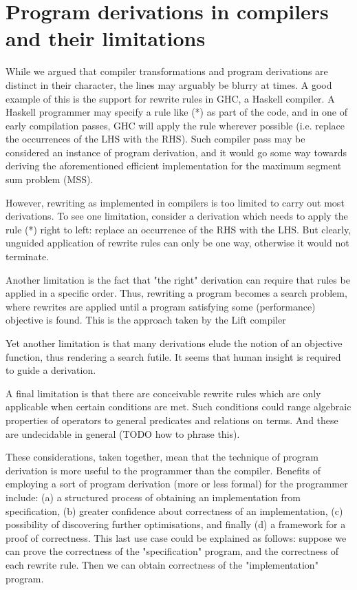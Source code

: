 \documentclass[bsc,frontabs,oneside,singlespacing,parskip,deptreport]{infthesis}
\theoremstyle{definition}
\theoremstyle{lemma}
\begin{document}
\section{Program derivations in compilers and their limitations}
\label{sec:progr-deriv-comp}

While we argued that compiler transformations and program derivations
are distinct in their character, the lines may arguably be blurry at
times. A good example of this is the support for rewrite rules in GHC,
a Haskell compiler. A Haskell programmer may specify a rule like (*)
as part of the code, and in one of early compilation passes, GHC will
apply the rule wherever possible (i.e. replace the occurrences of the
LHS with the RHS). Such compiler pass may be considered an instance of
program derivation, and it would go some way towards deriving the
aforementioned efficient implementation for the maximum segment sum
problem (MSS).

However, rewriting as implemented in compilers is too limited to carry
out most derivations. To see one limitation, consider a derivation
which needs to apply the rule (*) right to left: replace an occurrence
of the RHS with the LHS. But clearly, unguided application of rewrite
rules can only be one way, otherwise it would not terminate.

Another limitation is the fact that "the right" derivation can require
that rules be applied in a specific order. Thus, rewriting a program
becomes a search problem, where rewrites are applied until a program
satisfying some (performance) objective is found. This is the approach
taken by the Lift compiler \cite{TODO}

Yet another limitation is that many derivations elude the notion of an
objective function, thus rendering a search futile. It seems that
human insight is required to guide a derivation.

A final limitation is that there are conceivable rewrite rules which
are only applicable when certain conditions are met. Such conditions
could range algebraic properties of operators to general predicates
and relations on terms. And these are undecidable in general (TODO how
to phrase this).

These considerations, taken together, mean that the technique of
program derivation is more useful to the programmer than the
compiler. Benefits of employing a sort of program derivation (more or
less formal) for the programmer include: (a) a structured process of
obtaining an implementation from specification, (b) greater confidence
about correctness of an implementation, (c) possibility of discovering
further optimisations, and finally (d) a framework for a proof of
correctness. This last use case could be explained as follows: suppose
we can prove the correctness of the "specification" program, and the
correctness of each rewrite rule. Then we can obtain correctness of
the "implementation" program.
\end{document}
